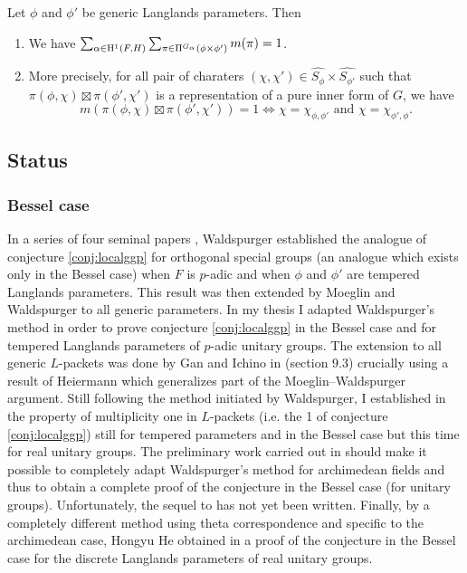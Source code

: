 \begin{conjecture}
\label{conj:localggp}
Let $\phi$ and $\phi'$ be generic Langlands parameters.
Then
\begin{enumerate}
    \item We have $\sum_{\alpha \in \mathrm{H}^1(F, H)} \sum_{\pi \in \Pi^{G_\alpha}(\phi \times \phi')} m(\pi) = 1$.
    \item More precisely, for all pair of charaters $(\chi, \chi') \in \widehat{S_\phi} \times \widehat{S_{\phi'}}$ such that $\pi(\phi, \chi) \boxtimes \pi(\phi', \chi')$ is a representation of a pure inner form of $G$, we have
    \[
        m(\pi(\phi, \chi) \boxtimes \pi(\phi', \chi')) = 1 \Leftrightarrow \chi = \chi_{\phi, \phi'}\text{ and }\chi = \chi_{\phi', \phi}.
    \]
\end{enumerate}
\end{conjecture}


\subsection{Status}

\subsubsection{Bessel case}

In a series of four seminal papers \cite{waldspurger1990demonstration,waldspurger2010formule,waldspurger2012calcul,waldspurger2012conjecture}, Waldspurger established the analogue of conjecture \ref{conj:localggp} for orthogonal special groups (an analogue which exists only in the Bessel case) when $F$ is $p$-adic and when $\phi$ and $\phi'$ are tempered Langlands parameters.
This result was then extended by Moeglin and Waldspurger \cite{moeglin2012conjecture} to all generic parameters.
In my thesis \cite{beuzart2014expression,beuzart2015endoscopie,beuzart2016conjecture} I adapted Waldspurger's method in order to prove conjecture \ref{conj:localggp} in the Bessel case and for tempered Langlands parameters of $p$-adic unitary groups.
The extension to all generic $L$-packets was done by Gan and Ichino in \cite{gan2016gross} (section 9.3) crucially using a result of Heiermann \cite{heiermann2016note} which generalizes part of the Moeglin--Waldspurger argument.
Still following the method initiated by Waldspurger, I established in \cite{beuzart2015local} the property of multiplicity one in $L$-packets (i.e. the 1 of conjecture \ref{conj:localggp}) still for tempered parameters and in the Bessel case but this time for real unitary groups. 
The preliminary work carried out in \cite{beuzart2015local} should make it possible to completely adapt Waldspurger's method for archimedean fields and thus to obtain a complete proof of the conjecture in the Bessel case (for unitary groups).
Unfortunately, the sequel to \cite{beuzart2015local} has not yet been written.
Finally, by a completely different method using theta correspondence and specific to the archimedean case, Hongyu He obtained in \cite{he2017gan} a proof of the conjecture in the Bessel case for the discrete Langlands parameters of real unitary groups.



